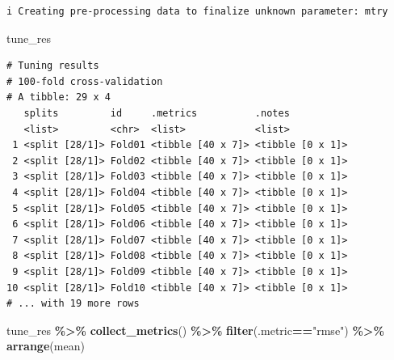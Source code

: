 \documentclass[
]{article}
\newenvironment{Shaded}{\begin{snugshade}}{\end{snugshade}}
\newcommand{\KeywordTok}[1]{\textcolor[rgb]{0.13,0.29,0.53}{\textbf{#1}}}
\newcommand{\NormalTok}[1]{#1}
\newcommand{\OperatorTok}[1]{\textcolor[rgb]{0.81,0.36,0.00}{\textbf{#1}}}
\newcommand{\StringTok}[1]{\textcolor[rgb]{0.31,0.60,0.02}{#1}}
\begin{document}
\begin{verbatim}
i Creating pre-processing data to finalize unknown parameter: mtry
\end{verbatim}

\begin{Shaded}
\begin{Highlighting}[]
\NormalTok{tune\_res}
\end{Highlighting}
\end{Shaded}

\begin{verbatim}
# Tuning results
# 100-fold cross-validation 
# A tibble: 29 x 4
   splits         id     .metrics          .notes          
   <list>         <chr>  <list>            <list>          
 1 <split [28/1]> Fold01 <tibble [40 x 7]> <tibble [0 x 1]>
 2 <split [28/1]> Fold02 <tibble [40 x 7]> <tibble [0 x 1]>
 3 <split [28/1]> Fold03 <tibble [40 x 7]> <tibble [0 x 1]>
 4 <split [28/1]> Fold04 <tibble [40 x 7]> <tibble [0 x 1]>
 5 <split [28/1]> Fold05 <tibble [40 x 7]> <tibble [0 x 1]>
 6 <split [28/1]> Fold06 <tibble [40 x 7]> <tibble [0 x 1]>
 7 <split [28/1]> Fold07 <tibble [40 x 7]> <tibble [0 x 1]>
 8 <split [28/1]> Fold08 <tibble [40 x 7]> <tibble [0 x 1]>
 9 <split [28/1]> Fold09 <tibble [40 x 7]> <tibble [0 x 1]>
10 <split [28/1]> Fold10 <tibble [40 x 7]> <tibble [0 x 1]>
# ... with 19 more rows
\end{verbatim}

\begin{Shaded}
\begin{Highlighting}[]
\NormalTok{tune\_res }\OperatorTok{\%>\%}
\StringTok{  }\KeywordTok{collect\_metrics}\NormalTok{() }\OperatorTok{\%>\%}\StringTok{ }
\StringTok{  }\KeywordTok{filter}\NormalTok{(.metric}\OperatorTok{==}\StringTok{"rmse"}\NormalTok{) }\OperatorTok{\%>\%}\StringTok{ }
\StringTok{  }\KeywordTok{arrange}\NormalTok{(mean)}
\end{Highlighting}
\end{Shaded}
\end{document}
